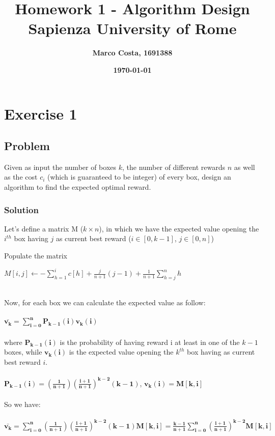 \documentclass[11pt]{article}
\title{\textbf{Homework 1 - Algorithm Design} \\ \bigskip \large \textbf{Sapienza University of Rome}}
\date{\textbf{\today}}
\author{\textbf{Marco Costa, 1691388}}
\begin{document}
\maketitle
\newpage

\section*{Exercise 1}
\subsection*{Problem}
Given as input the number of boxes $k$, the number of different rewards $n$ as well as
the cost $c_i$ (which is guaranteed to be integer) of every box, design an algorithm to find the expected optimal reward.
\subsubsection*{Solution}
Let's define a matrix M ($k \times n$), in which we have the expected value opening the $i^{th}$ box having $j$ as current best reward ($i \in [0, k-1]$, $j \in [0, n]$)
\begin{algorithm}
	\caption{Populate the matrix}\label{euclid}
	\begin{algorithmic}[1]
		\State $M[i,j] \gets -\sum\limits_{h=1}^i c[h] + \frac{j}{n+1}(j-1) + \frac{1}{n+1}\sum\limits_{h=j}^n h$
		\EndFor		
		\EndFor
	\end{algorithmic}
\end{algorithm}\\
Now, for each box we can calculate the expected value as follow: \\ \\
$\mathbf{\bar{v_k} = \sum\limits_{i=0}^n P_{k-1}(i)v_k(i)}$ \\ \\
where $\mathbf{P_{k-1}(i)}$ is the probability of having reward i at least in one of the $\mathit{k-1}$ boxes, while $\mathbf{v_k(i)}$ is the expected value opening the $\mathit{k^{th}}$ box having as current best reward $\mathit{i}$. \\ \\
$\mathbf{P_{k-1}(i) = (\frac{1}{n+1})(\frac{i+1}{n+1})^{k-2}(k-1)}$, \qquad $\mathbf{v_k(i) = M[k,i]}$ \\ \\
So we have: \\ \\
$\mathbf{\bar{v_k} = \sum\limits_{i=0}^n (\frac{1}{n+1})(\frac{i+1}{n+1})^{k-2}(k-1)M[k,i] = \frac{k-1}{n+1} \sum\limits_{i=0}^n (\frac{i+1}{n+1})^{k-2}M[k,i]}$ \\ \\
\end{document}

